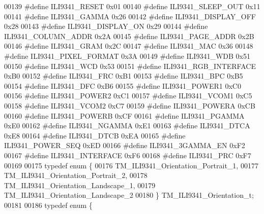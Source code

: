 \begin{DoxyCode}
00139 \textcolor{preprocessor}{#define ILI9341\_RESET               0x01}
00140 \textcolor{preprocessor}{#define ILI9341\_SLEEP\_OUT           0x11}
00141 \textcolor{preprocessor}{#define ILI9341\_GAMMA               0x26}
00142 \textcolor{preprocessor}{#define ILI9341\_DISPLAY\_OFF         0x28}
00143 \textcolor{preprocessor}{#define ILI9341\_DISPLAY\_ON          0x29}
00144 \textcolor{preprocessor}{#define ILI9341\_COLUMN\_ADDR         0x2A}
00145 \textcolor{preprocessor}{#define ILI9341\_PAGE\_ADDR           0x2B}
00146 \textcolor{preprocessor}{#define ILI9341\_GRAM                0x2C}
00147 \textcolor{preprocessor}{#define ILI9341\_MAC                 0x36}
00148 \textcolor{preprocessor}{#define ILI9341\_PIXEL\_FORMAT        0x3A}
00149 \textcolor{preprocessor}{#define ILI9341\_WDB                 0x51}
00150 \textcolor{preprocessor}{#define ILI9341\_WCD                 0x53}
00151 \textcolor{preprocessor}{#define ILI9341\_RGB\_INTERFACE       0xB0}
00152 \textcolor{preprocessor}{#define ILI9341\_FRC                 0xB1}
00153 \textcolor{preprocessor}{#define ILI9341\_BPC                 0xB5}
00154 \textcolor{preprocessor}{#define ILI9341\_DFC                 0xB6}
00155 \textcolor{preprocessor}{#define ILI9341\_POWER1              0xC0}
00156 \textcolor{preprocessor}{#define ILI9341\_POWER2              0xC1}
00157 \textcolor{preprocessor}{#define ILI9341\_VCOM1               0xC5}
00158 \textcolor{preprocessor}{#define ILI9341\_VCOM2               0xC7}
00159 \textcolor{preprocessor}{#define ILI9341\_POWERA              0xCB}
00160 \textcolor{preprocessor}{#define ILI9341\_POWERB              0xCF}
00161 \textcolor{preprocessor}{#define ILI9341\_PGAMMA              0xE0}
00162 \textcolor{preprocessor}{#define ILI9341\_NGAMMA              0xE1}
00163 \textcolor{preprocessor}{#define ILI9341\_DTCA                0xE8}
00164 \textcolor{preprocessor}{#define ILI9341\_DTCB                0xEA}
00165 \textcolor{preprocessor}{#define ILI9341\_POWER\_SEQ           0xED}
00166 \textcolor{preprocessor}{#define ILI9341\_3GAMMA\_EN           0xF2}
00167 \textcolor{preprocessor}{#define ILI9341\_INTERFACE           0xF6}
00168 \textcolor{preprocessor}{#define ILI9341\_PRC                 0xF7}
00169 
00175 \textcolor{keyword}{typedef} \textcolor{keyword}{enum} \{
00176     TM\_ILI9341\_Orientation\_Portrait\_1,
00177     TM\_ILI9341\_Orientation\_Portrait\_2,
00178     TM\_ILI9341\_Orientation\_Landscape\_1,
00179     TM\_ILI9341\_Orientation\_Landscape\_2
00180 \} TM\_ILI9341\_Orientation\_t;
00181 
00186 \textcolor{keyword}{typedef} \textcolor{keyword}{enum} \{

\end{DoxyCode}
